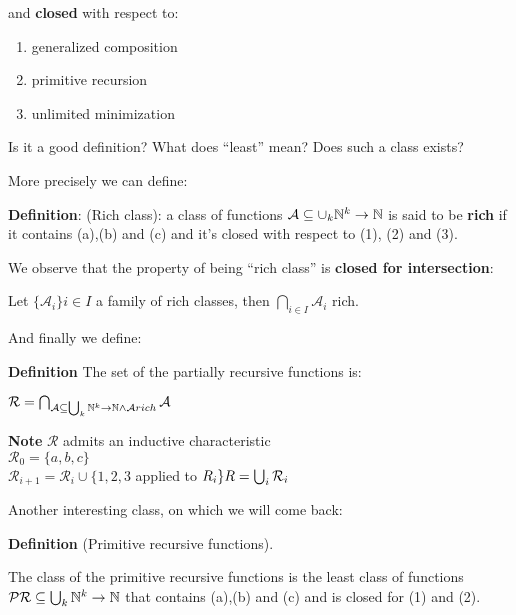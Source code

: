 and \textbf{closed} with respect to:
\begin{enumerate}
\item generalized composition
\item primitive recursion
\item unlimited minimization
\end{enumerate}

Is it a good definition? What does ``least'' mean? Does such a class exists?

More precisely we can define:

\textbf{Definition}: (Rich class): a class of functions $\mathcal{A} \subseteq \cup_k \mathbb{N}^k\rightarrow\mathbb{N}$ is said to be \textbf{rich} if it contains (a),(b) and (c) and it's closed with respect to (1), (2) and (3).

We observe that the property of being ``rich class'' is \textbf{closed for intersection}:

Let $\{\mathcal{A}_i\}i\in I$ a family of rich classes, then $\bigcap_{i\in I}\mathcal{A}_i$ rich.

And finally we define:

\textbf{Definition} The set of the partially recursive functions is:

$\mathcal{R} = \bigcap_{\mathcal{A} \subseteq \bigcup_k \mathbb{N}^k\rightarrow\mathbb{N}
  \land
  \mathcal{A}rich} \mathcal{A}$

\textbf{Note} $\mathcal{R}$ admits an inductive characteristic\\
$\mathcal{R}_0 = \{a,b,c\}$\\
$\mathcal{R}_{i+1} = \mathcal{R}_i \cup \{1,2,3 $ applied to $ R_i\}\\
R = \bigcup_i \mathcal{R}_i$

Another interesting class, on which we will come back:

\textbf{Definition} (Primitive recursive functions).

The class of the primitive recursive functions is the least class of functions $\mathcal{PR}\subseteq \bigcup_k\mathbb{N}^k\rightarrow\mathbb{N}$ that contains (a),(b) and (c) and is closed for (1) and (2).

